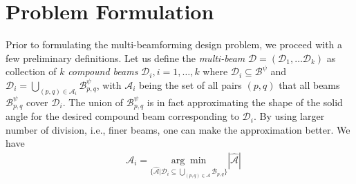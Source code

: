 \section{Problem Formulation}
\label{sec:problem}

% 
% 








Prior to formulating the multi-beamforming design problem, we proceed with a few preliminary definitions. Let us define the \emph{multi-beam}  $\mathcal{D} =(\mathcal{D}_1, \ldots \mathcal{D}_k)$ as collection of $k$ \emph{compound beams} $\mathcal{D}_i, i = 1,\ldots, k$ where $\mathcal{D}_i \subseteq \mathcal{B}^{\psi}$ and $\mathcal{D}_i = {\bigcup}_{{(p,q) \in \mathcal{A}_i}} \mathcal{B}^{\psi}_{p,q}$, with $\mathcal{A}_i$ being the set of all pairs $(p,q)$ that all beams $\mathcal{B}^{\psi}_{p,q}$ cover $\mathcal{D}_i$. The union of $\mathcal{B}^{\psi}_{p,q}$ is in fact approximating the shape of the solid angle for the desired compound beam corresponding to $\mathcal{D}_i$. By using larger number of division, i.e., finer beams, one can make the approximation better. We have 
\begin{align}
    &\mathcal{A}_i = \underset{\{\mathcal{\hat{A}}|\mathcal{D}_i \subseteq \underset{(p,q) \in \mathcal{A}}{\bigcup} \mathcal{B}_{p,q}\}}{\arg\min} |\mathcal{\hat{A}}|
\end{align}


